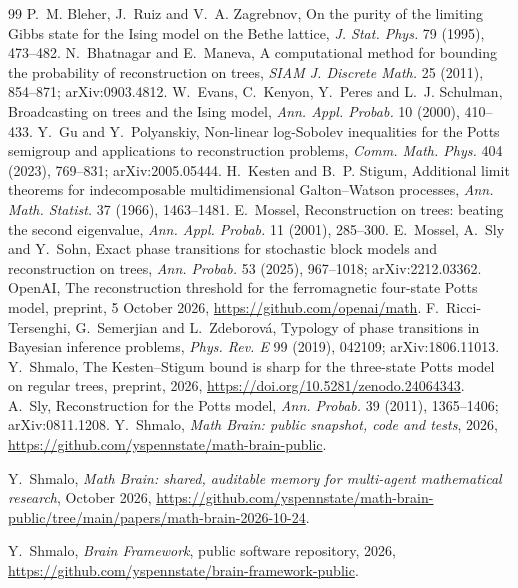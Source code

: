 \documentclass[11pt]{amsart}
\theoremstyle{definition}
\theoremstyle{remark}
\begin{document}
\begin{thebibliography}{99}
 P.~M. Bleher, J.~Ruiz and V.~A. Zagrebnov, On the purity of the limiting Gibbs state for
the Ising model on the Bethe lattice, \emph{J. Stat. Phys.} 79 (1995), 473--482.
 N.~Bhatnagar and E.~Maneva, A computational method for bounding the probability of
reconstruction on trees, \emph{SIAM J. Discrete Math.} 25 (2011), 854--871; arXiv:0903.4812.
 W.~Evans, C.~Kenyon, Y.~Peres and L.~J. Schulman, Broadcasting on trees and the Ising
model, \emph{Ann. Appl. Probab.} 10 (2000), 410--433.
 Y.~Gu and Y.~Polyanskiy, Non-linear log-Sobolev inequalities for the Potts semigroup and
applications to reconstruction problems, \emph{Comm. Math. Phys.} 404 (2023), 769--831; arXiv:2005.05444.
 H.~Kesten and B.~P. Stigum, Additional limit theorems for indecomposable multidimensional
Galton--Watson processes, \emph{Ann. Math. Statist.} 37 (1966), 1463--1481.
 E.~Mossel, Reconstruction on trees: beating the second eigenvalue, \emph{Ann. Appl.
Probab.} 11 (2001), 285--300.
 E.~Mossel, A.~Sly and Y.~Sohn, Exact phase transitions for stochastic block models and
reconstruction on trees, \emph{Ann. Probab.} 53 (2025), 967--1018; arXiv:2212.03362.
 OpenAI, The reconstruction threshold for the ferromagnetic four-state Potts model,
preprint, 5 October 2026, \url{https://github.com/openai/math}.
 F.~Ricci-Tersenghi, G.~Semerjian and L.~Zdeborov\'a, Typology of phase transitions in
Bayesian inference problems, \emph{Phys. Rev. E} 99 (2019), 042109; arXiv:1806.11013.
 Y.~Shmalo, The Kesten--Stigum bound is sharp for the three-state Potts model on regular
trees, preprint, 2026, \url{https://doi.org/10.5281/zenodo.24064343}.
 A.~Sly, Reconstruction for the Potts model, \emph{Ann. Probab.} 39 (2011), 1365--1406;
arXiv:0811.1208.
 Y.~Shmalo, \emph{Math Brain: public snapshot, code and tests}, 2026, \url{https://github.com/yspennstate/math-brain-public}.

 Y.~Shmalo, \emph{Math Brain: shared, auditable memory for multi-agent mathematical research}, October 2026, \url{https://github.com/yspennstate/math-brain-public/tree/main/papers/math-brain-2026-10-24}.

 Y.~Shmalo, \emph{Brain Framework}, public software repository, 2026, \url{https://github.com/yspennstate/brain-framework-public}.

\end{thebibliography}
\end{document}
